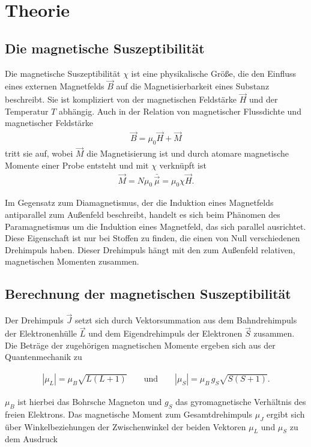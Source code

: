 
\section{Theorie}
\subsection{Die magnetische Suszeptibilität}
Die magnetische Suszeptibilität $\chi$ ist eine physikalische Größe, die den Einfluss eines externen Magnetfelds $\vec B$ auf
die Magnetisierbarkeit eines Substanz beschreibt. Sie ist kompliziert von der magnetischen Feldstärke $\vec H$ und der Temperatur $T$
abhängig. Auch in der Relation von magnetischer Flussdichte und magnetischer Feldstärke 
\begin{align}
 \vec B = \mu_0 \vec H + \vec M
\end{align}
tritt sie auf, wobei $\vec M$ die Magnetisierung ist und durch atomare magnetische Momente einer Probe entsteht und mit $\chi$ verknüpft ist
\begin{align}
 \vec M = N \mu_0 \,  \bar{\vec{\mu}} =\mu_0 \chi \vec H.
\end{align}

Im Gegensatz zum Diamagnetismus, der die Induktion eines Magnetfelds antiparallel zum Außenfeld beschreibt, handelt es sich beim
Phänomen des Paramagnetismus um die Induktion eines Magnetfeld, das sich parallel ausrichtet. Diese Eigenschaft ist nur bei Stoffen
zu finden, die einen von Null verschiedenen Drehimpuls haben. Dieser Drehimpuls hängt mit den zum Außenfeld relativen, magnetischen 
Momenten zusammen.

\subsection{Berechnung der magnetischen Suszeptibilität}
Der Drehimpuls $\vec J$ setzt sich durch Vektorsummation aus dem Bahndrehimpuls der Elektronenhülle $\vec L$ und dem Eigendrehimpuls der Elektronen 
$\vec S$ zusammen. Die Beträge der zugehörigen magnetischen Momente ergeben sich aus der Quantenmechanik zu

\begin{align}
 | \mu_L | = \mu_B \sqrt{L(L+1)} \qquad \text{und} \qquad |\mu_S| = \mu_B \, g_S \sqrt{S(S+1)}.
\end{align}

$\mu_B$ ist hierbei das Bohrsche Magneton und $g_S$ das gyromagnetische Verhältnis des freien Elektrons. Das magnetische Moment zum
Gesamtdrehimpuls $\mu_J$ ergibt sich über Winkelbeziehungen der Zwischenwinkel der beiden Vektoren $\mu_L$ und $\mu_S$ zu dem Ausdruck

